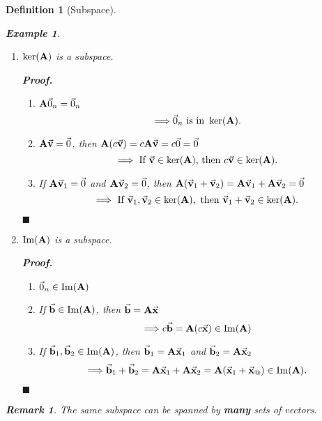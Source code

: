 \documentclass[12pt, a4paper]{article}
\newtheorem{df}{Definition}[subsection]
\newtheorem{eg}{Example}[subsection]
\newtheorem*{rmk}{\indent Remark}
\newenvironment*{prf}{\par\indent\textbf{\textit{Proof. }}}{\hfill $\blacksquare$\par}
\def\IM{{\mathrm{Im}}}
\def\vecx{\va{x}}
\def\vecv{\va{v}}
\def\vecb{\va{b}}
\def\matrixA{\vb{A}}
\begin{document}
\begin{df}[Subspace]
\begin{eg}
\begin{enumerate}
		\item $\ker(\matrixA)$ is a subspace.\\
		\begin{prf}
			\begin{enumerate}
				\item $\matrixA\vec{0}_n=\vec{0}_n$\[\Longrightarrow\vec{0}_n\text{ is in }\ker(\matrixA).\]
				\item $\matrixA\vecv=\vec{0}$, then $\matrixA(c\vecv)=c\matrixA\vecv=c\vec{0}=\vec{0}$\[\Longrightarrow\text{ If }\vecv\in\ker(\matrixA)\text{, then }c\vecv\in\ker(\matrixA).\]
				\item If $\matrixA\vecv_1=\vec{0}$ and $\matrixA\vecv_2=\vec{0}$, then $\matrixA(\vecv_1+\vecv_2)=\matrixA\vecv_1+\matrixA\vecv_2=\vec{0}$\[\Longrightarrow\text{ If }\vecv_1,\vecv_2\in\ker(\matrixA),\text{ then }\vecv_1+\vecv_2\in\ker(\matrixA).\]
			\end{enumerate}	
		\end{prf}
		\item $\IM(\matrixA)$ is a subspace.\\
		\begin{prf}
			\begin{enumerate}
				\item $\vec{0}_n\in\IM(\matrixA)$
				\item If $\vecb\in\IM(\matrixA)$, then $\vecb=\matrixA\vecx$\[\Longrightarrow c\vecb=\matrixA(c\vecx)\in\IM(\matrixA)\]
				\item If $\vecb_1,\vecb_2\in\IM(\matrixA)$, then $\vecb_1=\matrixA\vecx_1$ and $\vecb_2=\matrixA\vecx_2$\[\Longrightarrow\vecb_1+\vecb_2=\matrixA\vecx_1+\matrixA\vecx_2=\matrixA(\vecx_1+\vecx_@)\in\IM(\matrixA).\]
			\end{enumerate}	
		\end{prf}
	\end{enumerate}
	\end{eg}
	\begin{rmk}
		The same subspace can be spanned by \textbf{many} sets of vectors.	
	\end{rmk}
\end{df}
\end{document}
